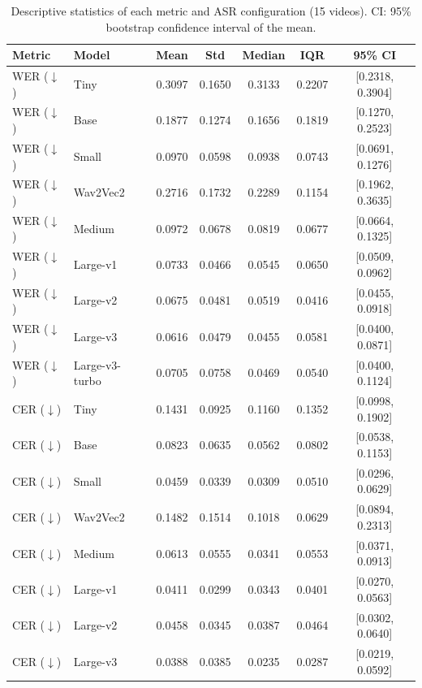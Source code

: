 \begin{table}[!t]
\centering
\caption{Descriptive statistics of each metric and ASR configuration (15 videos). CI: 95\% bootstrap confidence interval of the mean.}
\label{tab:desc}
\scriptsize
\renewcommand{\arraystretch}{1.0}
\begin{tabular}{llccccc}
\toprule
\textbf{Metric} & \textbf{Model} & \textbf{Mean} & \textbf{Std} & \textbf{Median} & \textbf{IQR} & \textbf{95\% CI} \\
\midrule
WER ($\downarrow$) & Tiny & 0.3097 & 0.1650 & 0.3133 & 0.2207 & [0.2318, 0.3904] \\
WER ($\downarrow$) & Base & 0.1877 & 0.1274 & 0.1656 & 0.1819 & [0.1270, 0.2523] \\
WER ($\downarrow$) & Small & 0.0970 & 0.0598 & 0.0938 & 0.0743 & [0.0691, 0.1276] \\
WER ($\downarrow$) & Wav2Vec2 & 0.2716 & 0.1732 & 0.2289 & 0.1154 & [0.1962, 0.3635] \\
WER ($\downarrow$) & Medium & 0.0972 & 0.0678 & 0.0819 & 0.0677 & [0.0664, 0.1325] \\
WER ($\downarrow$) & Large-v1 & 0.0733 & 0.0466 & 0.0545 & 0.0650 & [0.0509, 0.0962] \\
WER ($\downarrow$) & Large-v2 & 0.0675 & 0.0481 & 0.0519 & 0.0416 & [0.0455, 0.0918] \\
WER ($\downarrow$) & Large-v3 & 0.0616 & 0.0479 & 0.0455 & 0.0581 & [0.0400, 0.0871] \\
WER ($\downarrow$) & Large-v3-turbo & 0.0705 & 0.0758 & 0.0469 & 0.0540 & [0.0400, 0.1124] \\
\midrule
CER ($\downarrow$) & Tiny & 0.1431 & 0.0925 & 0.1160 & 0.1352 & [0.0998, 0.1902] \\
CER ($\downarrow$) & Base & 0.0823 & 0.0635 & 0.0562 & 0.0802 & [0.0538, 0.1153] \\
CER ($\downarrow$) & Small & 0.0459 & 0.0339 & 0.0309 & 0.0510 & [0.0296, 0.0629] \\
CER ($\downarrow$) & Wav2Vec2 & 0.1482 & 0.1514 & 0.1018 & 0.0629 & [0.0894, 0.2313] \\
CER ($\downarrow$) & Medium & 0.0613 & 0.0555 & 0.0341 & 0.0553 & [0.0371, 0.0913] \\
CER ($\downarrow$) & Large-v1 & 0.0411 & 0.0299 & 0.0343 & 0.0401 & [0.0270, 0.0563] \\
CER ($\downarrow$) & Large-v2 & 0.0458 & 0.0345 & 0.0387 & 0.0464 & [0.0302, 0.0640] \\
CER ($\downarrow$) & Large-v3 & 0.0388 & 0.0385 & 0.0235 & 0.0287 & [0.0219, 0.0592] \\

\end{tabular}
\end{table}
